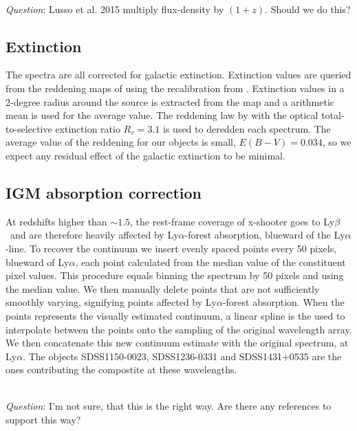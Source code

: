 \documentclass{aa}    %
\newcommand{\sectlabel}[1]{\label{sect:#1}}
\newcommand{\lya}{Ly$\alpha$}
\newcommand{\lyb}{Ly$\beta$}
\newcommand{\todo}[3]{{\color{#2}\emph{#1}: #3}}
\newcommand{\qtodo}[1]{\todo{\\ Question}{red}{#1}}
\begin{document}
\qtodo{Lusso et al. 2015 multiply flux-density by $(1+z)$. Should we do this?}

\subsection{Extinction} \sectlabel{extinct}

The spectra are all corrected for galactic extinction. Extinction values are queried from the reddening maps of \citep{Schlegel1998} using the recalibration from \citep{Schlafly2011}. Extinction values in a 2-degree radius around the source is extracted from the map and a arithmetic mean is used for the average value. The reddening law by \citep{Fitzpatrick1999} with the optical total-to-selective extinction ratio $R_v = 3.1$ is used to deredden each spectrum. The average value of the reddening for our objects is small, $E(B-V) = 0.034$, so we expect any residual effect of the galactic extinction to be minimal. 


\subsection{IGM absorption correction} \sectlabel{igm}

At redshifts higher than $\sim1.5$, the rest-frame coverage of x-shooter goes to \lyb~and are therefore heavily affected by \lya-forest absorption, blueward of the \lya-line. To recover the continuum we insert evenly spaced points every 50 pixels, blueward of \lya, each point calculated from the median value of the constituent pixel values. This procedure equals binning the spectrum by 50 pixels and using the median value. We then manually delete points that are not sufficiently smoothly varying, signifying points affected by \lya-forest absorption. When the points represents the visually estimated continuum, a linear spline is the used to interpolate between the points onto the sampling of the original wavelength array. We then concatenate this new continuum estimate with the original spectrum, at \lya. The objects SDSS1150-0023, SDSS1236-0331 and SDSS1431+0535 are the ones contributing the compostite at these wavelengths. 

\qtodo{I'm not sure, that this is the right way. Are there any references to support this way?}
\end{document}
